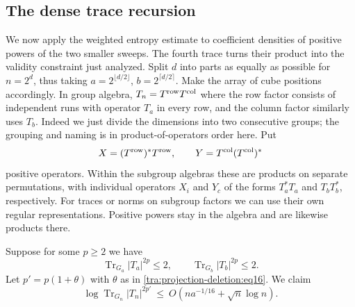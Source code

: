 \subsection{The dense trace recursion}
\label{tra:projection-deletion:operator-split}
We now apply the weighted entropy estimate to coefficient densities of positive powers of the two smaller sweeps. The fourth trace turns their product into the validity constraint just analyzed. Split \(d\) into parts as equally as possible for \(n=2^d\), thus taking \(a=2^{\lfloor d/2\rfloor}\), \(b=2^{\lceil d/2\rceil}\). Make the array of cube positions accordingly. In group algebra, \(T_n=T^{\rm row}T^{\rm col}\) where the row factor consists of independent runs with operator \(T_a\) in every row, and the column factor similarly uses \(T_b\). Indeed we just divide the dimensions into two consecutive groups; the grouping and naming is in product-of-operators order here. Put
\[
X=(T^{\rm row})^*T^{\rm row},\qquad Y=T^{\rm col}(T^{\rm col})^*
\]
positive operators. Within the subgroup algebras these are products on separate permutations, with individual operators \(X_i\) and \(Y_c\) of the forms \(T_a^*T_a\) and \(T_b T_b^*\), respectively. For traces or norms on subgroup factors we can use their own regular representations. Positive powers stay in the algebra and are likewise products there.
\begin{proposition}\label{tra:projection-deletion:recursion}
\label{tra:projection-deletion:trace-recursion-statement}
Suppose for some \(p\ge2\) we have
\begin{equation}
\operatorname{Tr}_{G_a}|T_a|^{2p}\le 2,\qquad
\operatorname{Tr}_{G_b}|T_b|^{2p}\le 2.
\label{tra:projection-deletion:eq17}
\end{equation}
Let \(p'=p(1+\theta)\) with \(\theta\) as in \eqref{tra:projection-deletion:eq16}. We claim
\begin{equation}
\log\operatorname{Tr}_{G_n}|T_n|^{2p'}\ \le\ O(n a^{-1/16}+\sqrt n\log n).
\label{tra:projection-deletion:eq18}
\end{equation}
\end{proposition}
